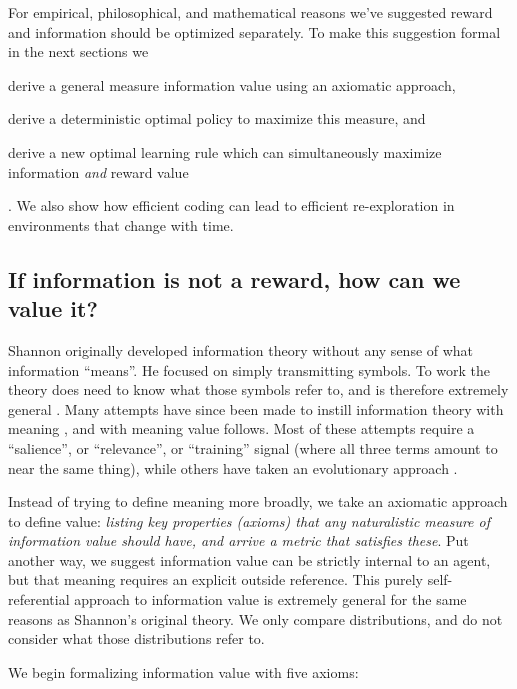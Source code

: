 \documentclass[9pt,twocolumn,twoside]{pnas-new}
\begin{document}
For empirical, philosophical, and mathematical reasons we've suggested reward and information should be optimized separately. To make this suggestion formal in the next sections we \begin{enumerate*} \item derive a general measure information value using an axiomatic approach, \item derive a deterministic optimal policy to maximize this measure, and \item derive a new optimal learning rule which can simultaneously maximize information \textit{and} reward value \end{enumerate*}. We also show how efficient coding can lead to efficient re-exploration in environments that change with time. 

    
\subsection*{If information is not a reward, how can we value it?}
Shannon originally developed information theory without any sense of what information ``means''. He focused on simply transmitting symbols. To work the theory does need to know what those symbols refer to, and is therefore extremely general \citep{Shannon1948}. Many attempts have since been made to instill information theory with meaning \citep{Kolchinsky2018}, and with meaning value follows. Most of these attempts require a ``salience'', or ``relevance'', or ``training'' signal (where all three terms amount to near the same thing), while others have taken an evolutionary approach \citep{Kolchinsky2018}.  

Instead of trying to define meaning more broadly, we take an axiomatic approach to define value: \textit{listing key properties (axioms) that any naturalistic measure of information value should have, and arrive a metric that satisfies these}. Put another way, we suggest information value can be strictly internal to an agent, but that meaning requires an explicit outside reference. This purely self-referential approach to information value is extremely general for the same reasons as Shannon's original theory. We only compare distributions, and do not consider what those distributions refer to.

We begin formalizing information value with five axioms:
\end{document}
